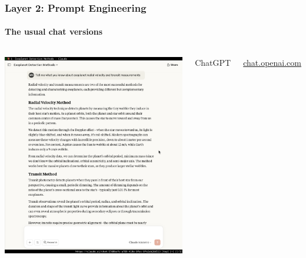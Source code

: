 \documentclass[aspectratio=169]{beamer}
\begin{document}
\begin{frame}
    \frametitle{Layer 2: Prompt Engineering}
    \framesubtitle{The usual chat versions}
    
    \begin{columns}
        \centering
        \includegraphics[width=\textwidth]{figures/chatgpt_screenshot.png}
        
        ChatGPT
        
        \url{chat.openai.com}
        

\end{columns}
\end{frame}
\end{document}
